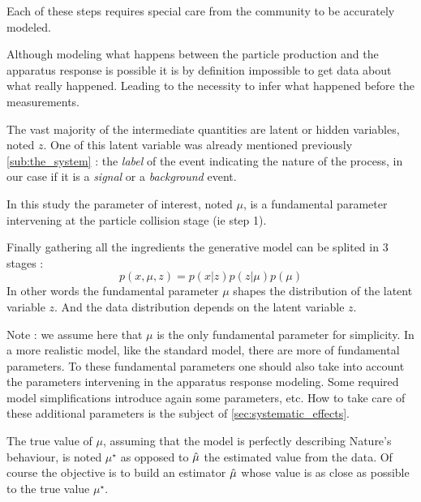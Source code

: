 Each of these steps requires special care from the community to be accurately modeled.

Although modeling what happens between the particle production and the apparatus response is possible it is by definition impossible to get data about what really happened.
Leading to the necessity to infer what happened before the measurements.


The vast majority of the intermediate quantities are latent or hidden variables, noted $z$.
One of this latent variable was already mentioned previously \autoref{sub:the_system} : the \emph{label} of the event indicating the nature of the process, in our case if it is a \emph{signal} or a \emph{background} event.


In this study the parameter of interest, noted $\mu$, is a fundamental parameter intervening at the particle collision stage (ie step 1).

Finally gathering all the ingredients the generative model can be splited in 3 stages :
\begin{equation}
	\label{eq:model_simple}
	p(x, \mu, z) = p(x|z) p(z | \mu) p(\mu)
\end{equation}
In other words the fundamental parameter $\mu$ shapes the distribution of the latent variable $z$.
And the data distribution depends on the latent variable $z$.

Note : we assume here that $\mu$ is the only fundamental parameter for simplicity.
In a more realistic model, like the standard model, there are more of fundamental parameters.
To these fundamental parameters one should also take into account the parameters intervening in the apparatus response modeling.
Some required model simplifications introduce again some parameters, etc.
How to take care of these additional parameters is the subject of \autoref{sec:systematic_effects}.

The true value of $\mu$, assuming that the model is perfectly describing Nature's behaviour, is noted $\mu^\star$ as opposed to $\hat\mu$ the estimated value from the data.
Of course the objective is to build an estimator $\hat\mu$ whose value is as close as possible to the true value $\mu^\star$.







